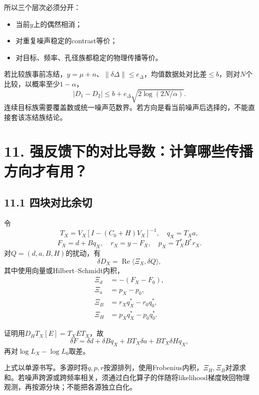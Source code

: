 \documentclass[
  10pt,
  a4paper,
]{article}
\providecommand{\tightlist}{%
  \setlength{\itemsep}{0pt}\setlength{\parskip}{0pt}}
\providecommand{\tightlist}{\setlength{\itemsep}{1pt}\setlength{\parskip}{1pt}}
\begin{document}
所以三个层次必须分开：

\begin{itemize}
\tightlist
\item
  当前\(y\)上的偶然相消；
\item
  对重复噪声稳定的contrast等价；
\item
  对目标、频率、孔径族都稳定的物理传播等价。
\end{itemize}

若比较族事前冻结，\(y=\mu+n\)、\(\|\delta\Delta\|\le e_\Delta\)，均值数据处对比差\(\le b\)，则对\(N\)个比较，以概率至少\(1-\alpha\)，
\[
|D_1-D_2|
\le b+e_\Delta\sqrt{2\log(2N/\alpha)}.
\]
连续目标族需要覆盖数或统一噪声范数界。若方向是看当前噪声后选择的，不能直接套该冻结族结论。

\hypertarget{ux5f3aux53cdux9988ux4e0bux7684ux5bf9ux6bd4ux5bfcux6570ux8ba1ux7b97ux54eaux4e9bux4f20ux64adux65b9ux5411ux624dux6709ux7528}{%
\section{11.
强反馈下的对比导数：计算哪些传播方向才有用？}\label{ux5f3aux53cdux9988ux4e0bux7684ux5bf9ux6bd4ux5bfcux6570ux8ba1ux7b97ux54eaux4e9bux4f20ux64adux65b9ux5411ux624dux6709ux7528}}

\hypertarget{ux56dbux5757ux5bf9ux6bd4ux4f59ux5207}{%
\subsection{11.1
四块对比余切}\label{ux56dbux5757ux5bf9ux6bd4ux4f59ux5207}}

令 \[
T_X=V_X[I-(C_0+H)V_X]^{-1},\quad
q_X=T_Xa,
\] \[
F_X=d+Bq_X,\quad r_X=y-F_X,\quad
p_X=T_X^*B^*r_X.
\] 对\(Q=(d,a,B,H)\)的扰动，有 \[
\delta D_X=\operatorname{Re}\langle\Xi_X,\delta Q\rangle,
\] 其中使用向量或Hilbert--Schmidt内积， \[
\boxed{
\begin{aligned}
\Xi_d&=-(F_X-F_0),\\
\Xi_a&=p_X-p_0,\\
\Xi_B&=r_Xq_X^*-r_0q_0^*,\\
\Xi_H&=p_Xq_X^*-p_0q_0^*.
\end{aligned}
}
\]

证明用\(D_HT_X[E]=T_XET_X\)，故 \[
\delta F=\delta d+\delta Bq_X+BT_X\delta a+BT_X\delta Hq_X,
\] 再对\(\log L_X-\log L_0\)取差。

上式以单源书写。多源时将\(q,p,r\)按源排列，使用Frobenius内积，\(\Xi_H,\Xi_B\)对源求和。若噪声跨源或跨频率相关，须通过白化算子的伴随将likelihood梯度映回物理观测，再按源分块；不能把各源独立白化。
\end{document}

